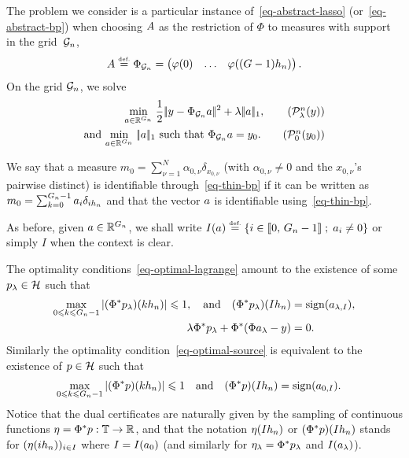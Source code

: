 The problem we consider is a particular instance of~\eqref{eq-abstract-lasso} (or~\eqref{eq-abstract-bp}) when choosing $A$ as the restriction of $\Phi$ to measures with support in the grid~$\mathcal{G}_n$,
\begin{align}
  A\stackrel{\mbox{\upshape\tiny def.}}{=}\Phi_{\mathcal{G}_n} = \begin{pmatrix}
    \varphi(0)& \ldots& \varphi((G-1){h_n})
  \end{pmatrix}.
\end{align}
On the grid $\mathcal{G}_n$, we solve
\begin{align}
  \umin{\vecthin \in \RR^\taillegridn} \frac{1}{2}\norm{y-\Phi_{\Gg_n} \vecthin}^2 + \la \norm{\vecthin}_1, \tag{$\Pp_\la^n(y)$}\label{eq-thin-lasso}\\
  \mbox{and }  \umin{\vecthin\in \RR^\taillegridn} \norm{\vecthin}_1 \mbox{ such that } \Phi_{\Gg_n} \vecthin=y_0.  \tag{$\Pp_0^n(y_0)$}\label{eq-thin-bp}
\end{align}

We say that a measure $m_0=\sum_{\nu=1}^N \alpha_{0,\nu} \delta_{x_{0,\nu}}$ (with $\alpha_{0,\nu}\neq 0$ and the $x_{0,\nu}$'s pairwise distinct) is identifiable through~\eqref{eq-thin-bp} if it can be written as $m_0=\sum_{k=0}^{{G_n}-1} a_i \delta_{i{h_n}}$ and that the vector $a$ is identifiable using~\eqref{eq-thin-bp}. 

As before, given $a\in \mathbb{R}^{{G_n}}$, we shall write $I(a) \stackrel{\mbox{\upshape\tiny def.}}{=} \left\{ i\in \llbracket 0,\,{G_n}-1 \rrbracket \;;\; a_i\neq 0 \right\}$ or simply $I$ when the context is clear.

The optimality conditions~\eqref{eq-optimal-lagrange} amount to the existence of some $p_\lambda\in \mathcal{H}$ such that
  \begin{align}
    \max_{0\leqslant k\leqslant {G_n}-1} |(\Phi^*p_\lambda)(k{h_n})|\leqslant 1,\quad \text{and} \quad (\Phi^*p_\lambda)(Ih_n)&=\operatorname{sign}(a_{\lambda,I}), \label{eq-optimal-thin-subdiff}\\
    \lambda  \Phi^*p_\lambda + \Phi^*(\Phi a_\lambda-y) &=0.\label{eq-optimal-thin-lagrange}
    \end{align}
Similarly the optimality condition~\eqref{eq-optimal-source} is equivalent to the existence of $p\in \mathcal{H}$ such that
    \begin{align}
    \max_{0\leqslant k\leqslant {G_n}-1}|(\Phi^*p)(k{h_n})| \leqslant 1 \quad \text{and} \quad (\Phi^* p)(Ih_n)&=\operatorname{sign}(a_{0,I}).\label{eq-optimal-thin-source}
\end{align}
Notice that the dual certificates are naturally given by the sampling of continuous functions $\eta=\Phi^*p: \mathbb{T}\rightarrow \mathbb{R}$, and that the notation $\eta(Ih_n)$ or $(\Phi^* p)(Ih_n)$ stands for $(\eta(i{h_n}))_{i\in I}$ where $I=I(a_0)$ (and similarly for $\eta_\lambda=\Phi^*p_\lambda$ and $I(a_\lambda)$).


